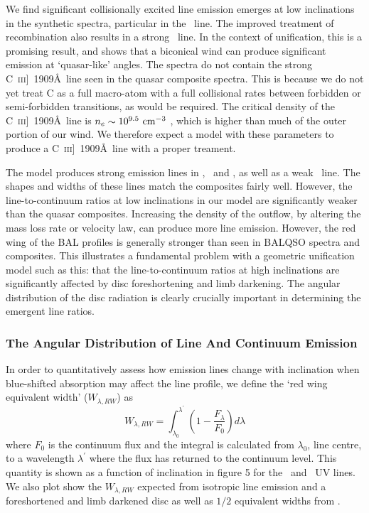 \documentclass[useAMS,usenatbib]{mn2e_x}
\begin{document}
We find significant collisionally excited line emission emerges
at low inclinations in the synthetic spectra, particular in the \civ\ line.
The improved treatment of recombination also results in a strong \la\ line. 
In the context of unification, this is a promising result, 
and shows that a biconical wind can produce significant 
emission at `quasar-like' angles. 
The spectra do not contain the strong C~\textsc{iii}]~1909\AA\, 
line seen in the quasar composite spectra. 
This is because we do not yet treat C as a full macro-atom with a 
full collisional rates between forbidden
or semi-forbidden transitions, as would be required.
The critical density of the C~\textsc{iii}]~1909\AA\, line 
is $n_e\sim10^{9.5}~\rm{cm^{-3}}$ \citep{wei1988}, which is higher than much of the 
outer portion of our wind. 
We therefore expect a model with these 
parameters to produce a C~\textsc{iii}]~1909\AA\ line
with a proper treament. 

The model produces strong emission lines in \civ, \nv\ and \la,
as well as a weak \mg\ line. The shapes and widths of these lines
match the composites fairly well. However, the line-to-continuum ratios 
at low inclinations in our model are significantly weaker than the quasar 
composites. Increasing the density of the outflow, by altering the mass 
loss rate  or velocity law, can produce more line emission.
However, the red wing of the BAL profiles is generally stronger than 
seen in BALQSO spectra and composites. This illustrates a fundamental 
problem with a geometric unification model such as this:
that the line-to-continuum ratios at high inclinations are
significantly affected by disc foreshortening and limb darkening.
The angular distribution of the disc radiation is clearly
crucially important in determining the emergent line ratios.  

\subsubsection{The Angular Distribution of Line And Continuum Emission}
\label{{sec:angular}}

In order to quantitatively assess how emission lines change with 
inclination when blue-shifted absorption 
may affect the line profile, we define the `red wing equivalent width' ($W_{\lambda,RW}$) as
\begin{equation}
W_{\lambda,RW} = \int_{\lambda_0}^{\lambda^\prime} \left( 1 - \frac{F_\lambda}{F_0} \right) d\lambda
\label{rwew}
\end{equation}
where $F_0$ is the continuum flux and the integral is calculated from $\lambda_0$, line centre,
to a wavelength $\lambda^\prime$ where the flux has returned to the continuum level.
This quantity is shown as a function of inclination in figure 5 for the \civ\ and \mg\ UV lines.
We also plot show the $W_{\lambda,RW}$ expected from isotropic line emission and a foreshortened 
and limb darkened disc  as well as $1/2$ equivalent widths from \cite{dipompeo2012b}. 
\end{document}
